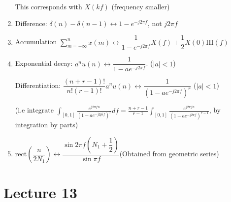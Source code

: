 \documentclass{article}
\begin{document}
\begin{enumerate}
        This corresponds with $X(kf)$ (frequency smaller)
        
        \item Difference: $\delta(n)-\delta(n-1)\leftrightarrow 1-e^{-j2\pi f}$, not $j2\pi f$
        
        \item Accumulation $\displaystyle\sum_{m=-\infty}^{n}x(m)\leftrightarrow \dfrac{1}{1-e^{-j2\pi f}}X(f)+\dfrac{1}{2}X(0)\mathrm{III}(f)$
        
        \item Exponential decay: $a^n u(n) \leftrightarrow \dfrac{1}{1-ae^{-j2\pi f}}$. ($|a|<1$)
        
        Differentiation: $\dfrac{(n+r-1)!}{n!(r-1)!}a^n u(n)\leftrightarrow\dfrac{1}{(1-ae^{-j2\pi f})^r}$ ($|a|<1$)
        
        (i.e integrate $\displaystyle\int_{[0,1]}{\frac{e^{j2\pi fn}}{(1-ae^{-j2pi f})^r}df}=\frac{n+r-1}{r-1}\int_{[0,1]}{\frac{e^{j2\pi fn}}{(1-ae^{-j2\pi f})^{r-1}}}$, by integration by parts)
        
        \item $\mathrm{rect}\left(\dfrac{n}{2N_1}\right)\leftrightarrow \dfrac{\sin{2\pi f\left(N_1+\dfrac{1}{2}\right)}}{\sin{\pi f}}$(Obtained from geometric series)
    \end{enumerate}
\section{Lecture 13}
\end{document}
